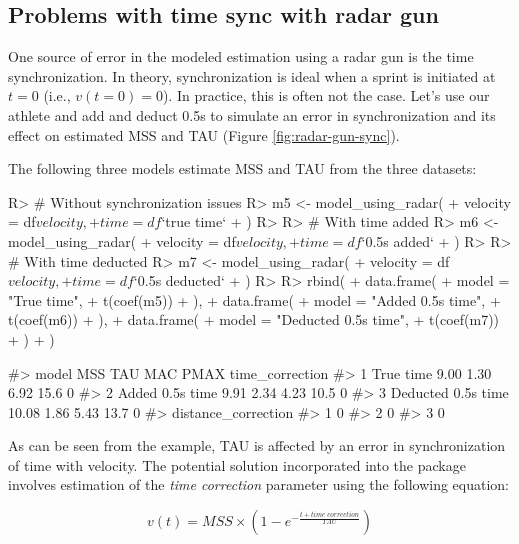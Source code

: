 \documentclass[
]{jss}
\begin{document}
\hypertarget{problems-with-time-sync-with-radar-gun}{%
\subsection{Problems with time sync with radar gun}\label{problems-with-time-sync-with-radar-gun}}

One source of error in the modeled estimation using a radar gun is the time synchronization. In theory, synchronization is ideal when a sprint is initiated at \(t=0\) (i.e., \(v(t=0) = 0\)). In practice, this is often not the case. Let's use our athlete and add and deduct 0.5s to simulate an error in synchronization and its effect on estimated MSS and TAU (Figure \ref{fig:radar-gun-sync}).

The following three models estimate MSS and TAU from the three datasets:

\begin{CodeChunk}
\begin{CodeInput}
R> # Without synchronization issues
R> m5 <- model_using_radar(
+   velocity = df$velocity,
+   time = df$`true time`
+ )
R> 
R> # With time added
R> m6 <- model_using_radar(
+   velocity = df$velocity,
+   time = df$`0.5s added`
+ )
R> 
R> # With time deducted
R> m7 <- model_using_radar(
+   velocity = df$velocity,
+   time = df$`0.5s deducted`
+ )
R> 
R> rbind(
+   data.frame(
+     model = "True time",
+     t(coef(m5))
+   ),
+   data.frame(
+     model = "Added 0.5s time",
+     t(coef(m6))
+   ),
+   data.frame(
+     model = "Deducted 0.5s time",
+     t(coef(m7))
+   )
+ )
\end{CodeInput}
\begin{CodeOutput}
#>                model   MSS  TAU  MAC PMAX time_correction
#> 1          True time  9.00 1.30 6.92 15.6               0
#> 2    Added 0.5s time  9.91 2.34 4.23 10.5               0
#> 3 Deducted 0.5s time 10.08 1.86 5.43 13.7               0
#>   distance_correction
#> 1                   0
#> 2                   0
#> 3                   0
\end{CodeOutput}
\end{CodeChunk}

As can be seen from the example, TAU is affected by an error in synchronization of time with velocity. The potential solution incorporated into the  package involves estimation of the \emph{time correction} parameter using the following equation:

\begin{equation}
  v(t) = MSS \times (1 - e^{-\frac{t + time \; correction}{TAU}}) \label{eq:velocity-time-correction}
\end{equation}
\end{document}
